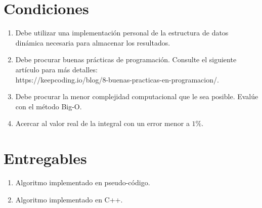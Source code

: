 \documentclass{article}
\begin{document}
\section*{Condiciones}
\begin{enumerate}
    \item Debe utilizar una implementación personal de la estructura de datos \\dinámica necesaria para almacenar los resultados.
    \item Debe procurar buenas prácticas de programación. Consulte el siguiente artículo para más detalles: \\ https://keepcoding.io/blog/8-buenas-practicas-en-programacion/.
    \item Debe procurar la menor complejidad computacional que le sea posible. Evalúe con el método Big-O.
    \item Acercar al valor real de la integral con un error menor a $1\%$.
\end{enumerate}

\section*{Entregables}
\begin{enumerate}
    \item Algoritmo implementado en pseudo-código.
    \item Algoritmo implementado en C++.
\end{enumerate}
\end{document}
